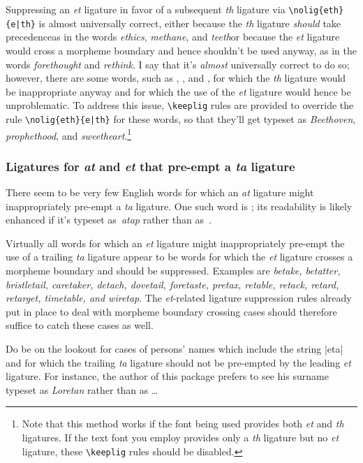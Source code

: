 \documentclass[11pt]{article}
\newcommand{\opt}[1]{\uselig{\texttt{#1}}}
\newcommand{\cmmd}[1]{\texttt{\textbackslash #1}}
\begin{document}
Suppressing an \emph{et} ligature in favor of a subsequent \emph{th} ligature via \Verb+\nolig{eth}{e|th}+ is almost universally correct, either because the \emph{th} ligature \emph{should} take precedence\textemdash as in the words \emph{ethics}, \emph{methane}, and \emph{teeth}\textemdash or because the \emph{et} ligature would cross a morpheme boundary and hence shouldn't be used anyway, as in the words \emph{forethought} and \emph{rethink}. 
I say that it's \emph{almost} universally correct to do so; however, there are some words, such as \opt{Beethoven}, \opt{prophethood}, and \opt{sweetheart}, for which the \emph{th} ligature would be inappropriate anyway and for which the use of the \emph{et} ligature would hence be unproblematic. To address this issue, \cmmd{keeplig} rules are provided to override the rule \Verb+\nolig{eth}{e|th}+ for these words, so that they'll get typeset as \emph{Beethoven}, \emph{prophethood}, and \emph{sweetheart}.\footnote{Note that this method works if the font being used provides both \emph{et} and \emph{th} ligatures. If the text font you employ provides only a \emph{th} ligature but no \emph{et} ligature, these \cmmd{keeplig} rules should be disabled.}


\subsubsection*{Ligatures for \emph{at} and \emph{et} that pre-empt a \emph{ta} ligature}

There seem to be very few English words for which an \emph{at} ligature might inappropriately pre-empt a \emph{ta} ligature. One such word is \opt{atap}; its readability is likely enhanced if it's typeset as~\emph{atap} rather than as~\emph{}.

Virtually all words for which an \emph{et} ligature might inappropriately pre-empt the use of a trailing \emph{ta} ligature appear to be words for which the \emph{et} ligature crosses a morpheme boundary and should be suppressed. Examples are \emph{betake, betatter, bristletail, caretaker, detach, dovetail, foretaste, pretax, retable, retack, retard, retarget, timetable, \emph{and} wiretap}. The \emph{et}-related ligature suppression rules already put in place to deal with morpheme boundary crossing cases should therefore suffice to catch these cases as well. 

Do be on the lookout for cases of persons' names which include the string |eta| and for which the trailing \emph{ta} ligature should not be pre-empted by the leading \emph{et} ligature. For instance, the author of this package prefers to see his surname typeset as \emph{Loretan} rather than as \emph{}\dots
\end{document}
